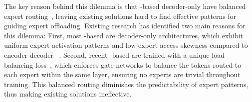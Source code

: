 The key reason behind this dilemma is that \MoE-based decoder-only \LLMs have balanced expert routing~\cite{song2024promoe}, leaving existing solutions hard to find effective patterns for guiding expert offloading.
%
%
Existing research has identified two main reasons for this dilemma:
%
First, most \MoE-based \LLMs are decoder-only architectures, which exhibit uniform expert activation patterns and low expert access skewness compared to encoder-decoder \MoE \LLMs~\cite{song2024promoe,gupta2024lynx}. 
%
Second, recent \MoE-based \LLMs are trained with a unique load balancing loss~\cite{jiang2024mixtral,snowflake-arctic,xai-grok,dai2024deepseekmoe,abdin2024phi}, which enforces gate networks to balance the tokens routed to each expert within the same \MoE layer, ensuring no experts are trivial throughout training.
This balanced routing diminishes the predictability of expert patterns, thus making existing solutions ineffective.


